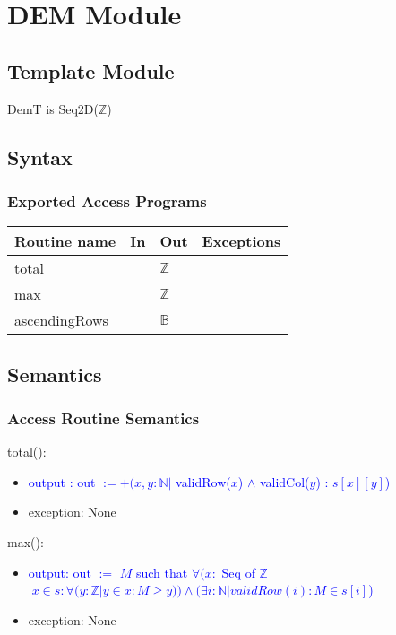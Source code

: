 \documentclass[12pt]{article}
\begin{document}
\newpage

\section* {DEM Module}

\subsection* {Template Module}

DemT is Seq2D($\mathbb{Z}$)

\subsection* {Syntax}

\subsubsection* {Exported Access Programs}

\begin{tabular}{| l | l | l | p{6cm} |}
\hline
\textbf{Routine name} & \textbf{In} & \textbf{Out} & \textbf{Exceptions}\\
\hline
total & & $\mathbb{Z}$ & \\
\hline
max &  & $\mathbb{Z}$ & \\
\hline
ascendingRows & & $\mathbb{B}$ & \\
\hline
\end{tabular}

\subsection* {Semantics}

\subsubsection* {Access Routine Semantics}

\noindent total(): 
\begin{itemize}
\item \textcolor{blue}{output : out $:= +(x, y : \mathbb{N} |$ validRow($x$) $\land$ validCol($y$) : $s[x][y]$)}
\item exception: None
\end{itemize}

\noindent max():
\begin{itemize}
\item \textcolor{blue}{output: out $:=$ $M$ such that $\forall (x : $ Seq of $\mathbb{Z}$ $| x \in s : \forall (y : \mathbb{Z} | y \in x : M \geq y ))  \land (\exists i : \mathbb{N} | validRow(i) : M \in s[i] $)}
\item exception: None
\end{itemize}
\end{document}
